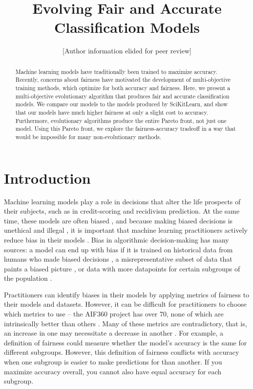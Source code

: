 \documentclass[10pt]{acmart}
\title{Evolving Fair and Accurate Classification Models}
\author{[Author information elided for peer review]}
\begin{document}
\begin{abstract}
Machine learning models have traditionally been trained to maximize accuracy. Recently, concerns about fairness have motivated the development of multi-objective training methods, which optimize for both accuracy and fairness. Here, we present a multi-objective evolutionary algorithm that produces fair and accurate classification models. We compare our models to the models produced by SciKitLearn, and show that our models have much higher fairness at only a slight cost to accuracy. Furthermore, evolutionary algorithms produce the entire Pareto front, not just one model. Using this Pareto front, we explore the fairness-accuracy tradeoff in a way that would be impossible for many non-evolutionary methods.
\end{abstract}


\maketitle
\section{Introduction}
Machine learning models play a role in decisions that alter the life prospects of their subjects, such as in credit-scoring and recidivism prediction. At the same time, these models are often biased \citep{Angwin:2016}, and because making biased decisions is unethical and illegal \citep{Barocas:2016}, it is important that machine learning practitioners actively reduce bias in their models \citep{Binns:2017}. Bias in algorithmic decision-making has many sources: a model can end up with bias if it is trained on historical data from humans who made biased decisions \citep{Calders:2013}, a misrepresentative subset of data that paints a biased picture \citep{Suresh:2019}, or data with more datapoints for certain subgroups of the population \citep{Torralba:2011}.

Practitioners can identify biases in their models by applying metrics of fairness to their models and datasets. However, it can be difficult for practitioners to choose which metrics to use – the AIF360 project has over 70, none of which are intrinsically better than others \citep{Bellamy:2018}. Many of these metrics are contradictory, that is, an increase in one may necessitate a decrease in another \citep{Kleinberg:2016}. For example, a definition of fairness could measure whether the model’s accuracy is the same for different subgroups. However, this definition of fairness conflicts with accuracy when one subgroup is easier to make predictions for than another. If you maximize accuracy overall, you cannot also have equal accuracy for each subgroup.
\end{document}
